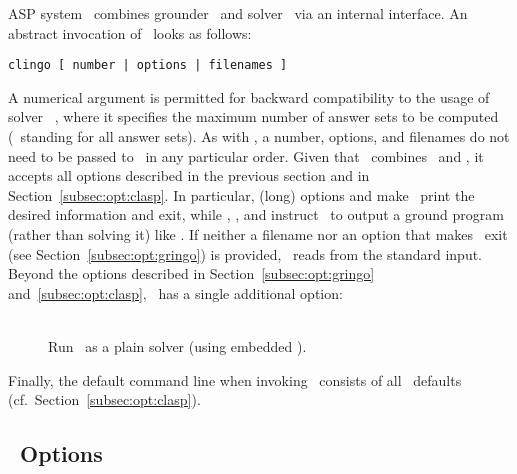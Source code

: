 ASP system \clingo\ combines grounder \gringo\ and solver \clasp\
via an internal interface.
An abstract invocation of \clingo\ looks as follows:
%
\begin{lstlisting}[numbers=none]
clingo [ number | options | filenames ]
\end{lstlisting}
%
A numerical argument is permitted for backward compatibility to
the usage of solver \smodels~\cite{siniso02a},
where it specifies the maximum number of answer sets to be computed
(\code{0}~standing for all answer sets).
As with \gringo, a number, options, and filenames do not need to be passed to \clingo\
in any particular order.
Given that \clingo\ combines \gringo\ and \clasp,
it accepts all options described in the previous section
and in Section~\ref{subsec:opt:clasp}.
In particular, (long) options \code{--help} and 
make \clingo\ print the desired information and exit,
while \code{--text}, \code{--lparse}, and \code{--reify}
instruct \clingo\ to output a ground program (rather than solving it) like \gringo.
If neither a filename nor an option that makes \clingo\ exit
(see Section~\ref{subsec:opt:gringo}) is provided, \clingo\ reads from the standard input.
Beyond the options described in Section~\ref{subsec:opt:gringo} and~\ref{subsec:opt:clasp},
\clingo\ has a single additional option:
%
\begin{description}
\item[]~\\
Run \clingo\ as a plain solver (using embedded \clasp).
\end{description}
%
Finally, the default command line when invoking \clingo\
consists of all \clasp\ defaults (cf.\ Section~\ref{subsec:opt:clasp}).


\subsection{\iclingo\ Options}\label{subsec:opt:clingo}

